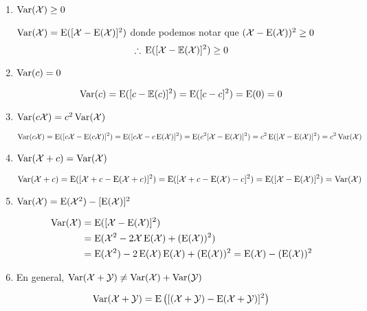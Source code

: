 \begin{enumerate}
\item $\operatorname{Var}(\mathcal X) \ge 0$
  \begin{myproof}
    $\operatorname{Var}(\mathcal X) = \operatorname{E}([\mathcal X - \operatorname{E}(\mathcal X)]^2)$ donde podemos notar que $(\mathcal X - \operatorname{E}(\mathcal X))^2 \ge 0$
    \[\therefore \, \operatorname{E}([\mathcal X - \mathbb E(\mathcal X)]^2) \ge 0 \]
  \end{myproof}
\item $\operatorname{Var}(c) = 0$
  \begin{myproof}
    \[\operatorname{Var}(c) = \operatorname{E}([c - \mathbb E(c)]^2) = \operatorname{E}([c - c]^2) = \operatorname{E}(0) = 0\]
  \end{myproof}
\item $\operatorname{Var}(c \mathcal X) = c^2 \operatorname{Var}(\mathcal X)$
  \begin{myproof}
    \[\operatorname{Var}(c\mathcal X) = \operatorname{E}([c\mathcal X - \operatorname{E}(c\mathcal X)]^2) = \operatorname{E}([c\mathcal X - c\operatorname{E}(\mathcal X)]^2) = \operatorname{E}(c^2[\mathcal X - \operatorname{E}(\mathcal X)]^2) = c^2\operatorname{E}([\mathcal X - \operatorname{E}(\mathcal X)]^2) = c^2 \operatorname{Var}(\mathcal X)\]
  \end{myproof}
\item $\operatorname{Var}(\mathcal X + c) = \operatorname{Var}(\mathcal X)$
  \begin{myproof}
    \[\operatorname{Var}(\mathcal X + c) = \operatorname{E}([\mathcal X + c - \operatorname{E}(\mathcal X + c)]^2) = \operatorname{E}([\mathcal X + c - \operatorname{E}(\mathcal X) - c]^2) = \operatorname{E}([\mathcal X - \operatorname{E}(\mathcal X)]^2) = \operatorname{Var}(\mathcal X)\]
  \end{myproof}
\item $\operatorname{Var}(\mathcal X) = \operatorname{E}(\mathcal X^2) - [\operatorname{E}(\mathcal X)]^2$
  \begin{myproof}
    \begin{align*}
      \operatorname{Var}(\mathcal X) &= \operatorname{E}([\mathcal X - \operatorname{E}(\mathcal X)]^2)\\
                             &= \operatorname{E}(\mathcal X^2 - 2\mathcal X\operatorname{E}(\mathcal X) + (\operatorname{E}(\mathcal X))^2)\\
                             &= \operatorname{E}(\mathcal X^2) - 2 \operatorname{E}(\mathcal X) \operatorname{E}(\mathcal X) + (\operatorname{E}(\mathcal X))^2 = \operatorname{E}(\mathcal X) - (\operatorname{E}(\mathcal X))^2
    \end{align*}
  \end{myproof}
\item En general, $\operatorname{Var}(\mathcal X + \mathcal Y) \neq \operatorname{Var}(\mathcal X) +\operatorname{Var}(\mathcal Y)$
  \begin{myproof}
    \begin{align*}
      \Var(\mathcal X + \mathcal Y) &= \E \left([(\mathcal X + \mathcal Y) - \E(\mathcal X + \mathcal Y)]^2\right) \\

\end{align*}
\end{myproof}
\end{enumerate}
